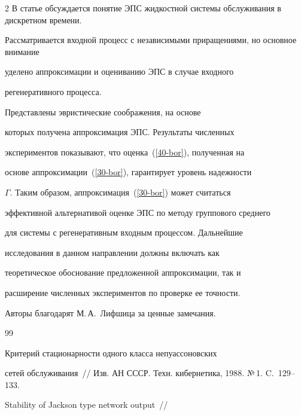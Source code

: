 \begin{multicols}{2}
В статье обсуждается понятие ЭПС жидкостной сис\-те\-мы обслуживания в дискретном времени.

 Рас\-смат\-ри\-ва\-ет\-ся  входной процесс с независимыми приращениями, но  основное внимание

уделено  аппроксимации и  оцениванию  ЭПС  в случае входного

регенеративного процесса.

 Представлены  эвристические соображения, на основе

которых получена аппроксимация  ЭПС. Результаты численных

экспериментов   показывают, что оценка~(\ref{40-bor}), полученная на

основе аппроксимации~(\ref{30-bor}), гарантирует  уровень надежности

$\Gamma$. Таким образом,  аппроксимация~(\ref{30-bor}) может считаться

эффективной альтернативой оценке ЭПС по методу группового среднего

для системы с регенеративным входным процессом. Дальнейшие

исследования   в данном направлении  должны включать как

теоретическое обоснование предложенной аппроксимации, так и

расширение численных экспериментов по проверке ее точ\-ности.



\bigskip



Авторы благодарят М.\,А.~Лифшица за  ценные замечания.



{\small\frenchspacing

{%


\begin{thebibliography}{99}




 Критерий стационарности одного класса непуассоновских

сетей обслуживания~// Изв. АН СССР. Техн. кибернетика, 1988. №\,1. C.~129--133.




 Stability of Jackson type network output~//


\end{thebibliography}}}
\end{multicols}
